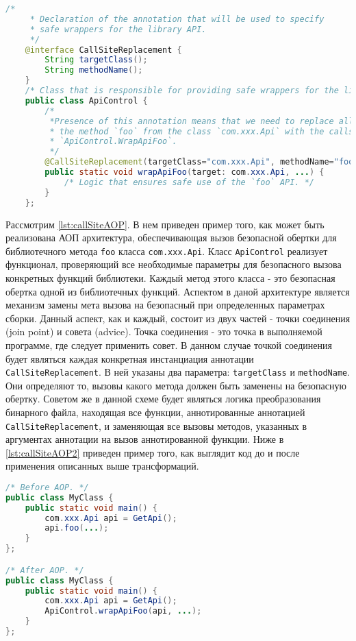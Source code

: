 \begin{lstlisting}[language=Java, caption=Пример решения задачи замены функции в месте вызова при помощи АОП, label=lst:callSiteAOP]
    /*
     * Declaration of the annotation that will be used to specify
     * safe wrappers for the library API.
     */
    @interface CallSiteReplacement {
        String targetClass();
        String methodName();
    }
    /* Class that is responsible for providing safe wrappers for the library API. */
    public class ApiControl {
        /*
         *Presence of this annotation means that we need to replace all calls to
         * the method `foo` from the class `com.xxx.Api` with the calls to
         * `ApiControl.WrapApiFoo`.
         */
        @CallSiteReplacement(targetClass="com.xxx.Api", methodName="foo");
        public static void wrapApiFoo(target: com.xxx.Api, ...) {
            /* Logic that ensures safe use of the `foo` API. */
        }
    };
\end{lstlisting}

Рассмотрим \autoref{lst:callSiteAOP}. В нем приведен пример того, как может быть реализована АОП архитектура, обеспечивающая вызов безопасной обертки для библиотечного метода \texttt{foo} класса \texttt{com.xxx.Api}. Класс \texttt{ApiControl} реализует функционал, проверяющий все необходимые параметры для безопасного вызова конкретных функций библиотеки. Каждый метод этого класса - это безопасная обертка одной из библиотечных функций. Аспектом в даной архитектуре является механизм замены мета вызова на безопасный при определенных параметрах сборки. Данный аспект, как и каждый, состоит из двух частей - точки соединения (join point) и совета (advice). Точка соединения - это точка в выполняемой программе, где следует применить совет. В данном случае точкой соединения будет являться каждая конкретная инстанциация аннотации \texttt{CallSiteReplacement}. В ней указаны два параметра: \texttt{targetClass} и \texttt{methodName}. Они определяют то, вызовы какого метода должен быть заменены на безопасную обертку. Советом же в данной схеме будет являться логика преобразования бинарного файла, находящая все функции, аннотированные аннотацией \texttt{CallSiteReplacement}, и заменяющая все вызовы методов, указанных в аргументах аннотации на вызов аннотированной функции. Ниже в  \autoref{lst:callSiteAOP2} приведен пример того, как выглядит код до и после применения описанных выше трансформаций.

\begin{lstlisting}[language=Java, caption=Демонстрация работы аспекта, label=lst:callSiteAOP2]
/* Before AOP. */
public class MyClass {
    public static void main() {
        com.xxx.Api api = GetApi();
        api.foo(...);
    }
};

/* After AOP. */
public class MyClass {
    public static void main() {
        com.xxx.Api api = GetApi();
        ApiControl.wrapApiFoo(api, ...);
    }
};
\end{lstlisting}


